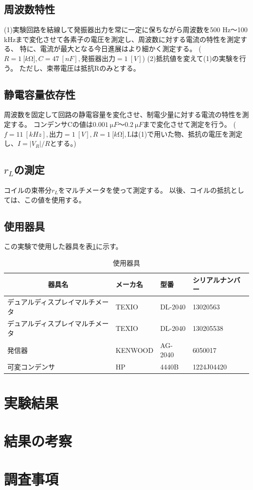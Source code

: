 \documentclass[11pt,a4paper,fleqn]{jsarticle}
\begin{document}
\subsection{周波数特性}
(1)実験回路を結線して発振器出力を常に一定に保ちながら周波数を500 Hz～100 kHzまで変化させて各素子の電圧を測定し、周波数に対する電流の特性を測定する、
特に、電流が最大となる今日進展はより細かく測定する。
($R=1\ \si{[k\ohm]}, C=47\ \si{[nF]}, 発振器出力=1\ \si{[V]}$)
(2)抵抗値を変えて(1)の実験を行う。
ただし、束帯電圧は抵抗Rのみとする。
\subsection{静電容量依存性}
周波数を固定して回路の静電容量を変化させ、制電少量に対する電流の特性を測定する。
コンデンサCの値は$0.001\ \si{\micro F}～0.2\ \si{\micro F}$まで変化させて測定を行う。
($f=11\ \si{[kHz]}, 出力=1\ \si{[V]}, R=1\ \si{[k\ohm]},$Lは(1)で用いた物、抵抗の電圧を測定し、$I=|V_{R}|/R$とする。)
\subsection{$r_{L}$の測定}
コイルの束帯分$r_{L}$をマルチメータを使って測定する。
以後、コイルの抵抗としては、この値を使用する。

\subsection{使用器具}
この実験で使用した器具を表\ref{cal:item}に示す。
\begin{table}[]
\centering
\caption{使用器具}
\label{cal:item}
\begin{tabular}{|l|l|l|l|}
\hline
\multicolumn{1}{|c|}{器具名} & メーカ名    & 型番      & シリアルナンバー   \\ \hline
デュアルディスプレイマルチメータ          & TEXIO   & DL-2040 & 13020563   \\ \hline
デュアルディスプレイマルチメータ          & TEXIO   & DL-2040 & 130205538  \\ \hline
発信器                       & KENWOOD & AG-2040 & 6050017    \\ \hline
可変コンデンサ                   & HP      & 4440B   & 1224J04420 \\ \hline
\end{tabular}
\end{table}
%
\section{実験結果}

\section{結果の考察}
%
\section{調査事項}
%
\end{document}
